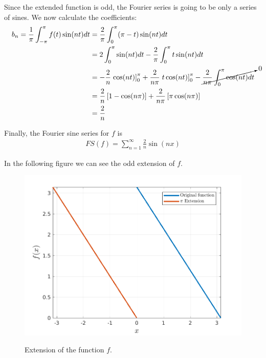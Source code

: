 \begin{questions}
\begin{solution}
Since the extended function is odd, the Fourier series is going to be only a series of sines. We now calculate the coefficients:
\begin{align*}
b_n=\frac{1}{\pi}\int_{-\pi}^{\pi}f(t)\sin(nt)dt&=\frac{2}{\pi}\int_{0}^{\pi}(\pi-t)\sin(nt)dt\\
&=2\int_{0}^{\pi}\sin(nt)dt-\frac{2}{\pi}\int_{0}^{\pi}t\sin(nt)dt\\
&=-\frac{2}{n}\left.\cos(nt)\right]_0^{\pi}+\frac{2}{n\pi}\left.t\cos(nt)\right]_0^{\pi}-\cancelto{0}{\frac{2}{n\pi}\int_0^{\pi}\cos(nt)dt}\\
&=\frac{2}{n}\left[1-\cos(n\pi)\right]+\frac{2}{n\pi}\left[\pi\cos(n\pi)\right]\\
&=\frac{2}{n}
\end{align*}

Finally, the Fourier sine series for $f$ is
\begin{align*}
FS(f)=\sum_{n=1}^{\infty}\frac{2}{n}\sin(nx)
\end{align*}
\end{solution}
\begin{solution}
In the following figure we can see the odd extension of $f$. 

\begin{figure}[H]
\centering     %
{\includegraphics[scale=0.50]{piExtension.png}}
\caption{Extension of the function $f$.}\end{figure}


\end{solution}
\end{questions}
